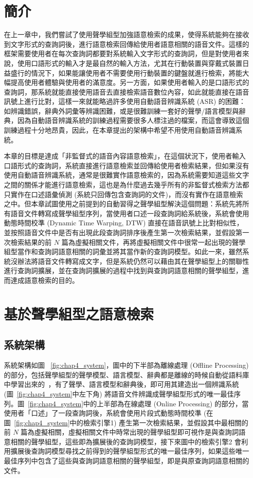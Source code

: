 \section{簡介}
在上一章中，我們嘗試了使用聲學組型加強語意檢索的成果，使得系統能夠在接收到文字形式的查詢詞後，進行語意檢索回傳給使用者語意相關的語音文件。這樣的框架需要使用者在每次查詢詞都要對系統輸入文字形式的查詢詞，但是對使用者來說，使用口語形式的輸入才是最自然的輸入方法，尤其在行動裝置與穿戴式裝置日益盛行的情況下，如果能讓使用者不需要使用行動裝置的鍵盤就進行檢索，將能大幅提高使用者體驗與使用者的滿意度。另一方面，如果使用者輸入的是口語形式的查詢詞，那系統就能直接使用語音去直接檢索語音數位內容，如此就能直接在語音訊號上進行比對，這樣一來就能略過許多使用自動語音辨識系統 (ASR) 的困難：如辨識錯誤，辭典外詞彙等辨識困難，或是很難訓練一套好的聲學/語言模型與辭典，因為自動語音辨識系統的訓練過程需要很多人標注過的檔案，而這會導致這個訓練過程十分地昂貴，因此，在本章提出的架構中希望不用使用自動語音辨識系統。

本章的目標是達成「非監督式的語音內容語意檢索」，在這個狀況下，使用者輸入口語形式的查詢詞，系統直接進行語意檢索並回傳給使用者檢索結果，但如果沒有使用自動語音辨識系統，通常是很難實作語意檢索的，因為系統需要知道這些文字之間的關係才能進行語意檢索，這也是為什麼過去幾乎所有的非監督式檢索方法都只實作在口述語彙偵測
(系統只回傳包含查詢詞的文件)，而沒有實作在語意檢索之中。但本章試圖使用之前提到的自動習得之聲學組型解決這個問題：系統先將所有語音文件轉寫成聲學組型序列，當使用者口述一段查詢詞給系統後，系統會使用動態時間校準 (Dynamic Time Warping, DTW) 直接在語音訊號上比對相似性，並按照語音文件中是否有出現此段查詢詞排序後產生第一次檢索結果，並假設第一次檢索結果的前 $N$
篇為虛擬相關文件，再將虛擬相關文件中很常一起出現的聲學組型當作和查詢詞語意相關的詞彙並將其當作新的查詢詞模型。如此一來，雖然系統沒辦法將語音文件轉寫成文字，但是系統仍然可以藉由其在聲學組型上的關聯性進行查詢詞擴展，並在查詢詞擴展的過程中找到與查詢詞語意相關的聲學組型，進而達成語意檢索的目的。

\section{基於聲學組型之語意檢索}
\subsection{系統架構}
系統架構如圖 ~\ref{fig:chap4_system}，圖中的下半部為離線處理 (Offline Processing) 的部分，包括聲學組型的聲學模型、語言模型、辭典都是離線的時候自動從語料庫中學習出來的~\cite{chung2013unsupervised}，有了聲學、語言模型和辭典後，即可用其建造出一個辨識系統 (圖~\ref{fig:chap4_system}中左下角) 將語音文件辨識成聲學組型形式的唯一最佳序列。圖~\ref{fig:chap4_system}中的上半部為在線處理 (Online Processing)
的部分，當使用者「口述」了一段查詢詞後，系統會使用片段式動態時間校準 (在圖~\ref{fig:chap4_system}中的檢索引擎1) 產生第一次檢索結果，並假設其中最相關的前 $N$ 篇為虛擬相關，虛擬相關文件中時常出現的聲學組型即可視作是與查詢詞語意相關的聲學組型，這些即為擴展後的查詢詞模型，接下來圖中的檢索引擎2 會利用擴展後查詢詞模型尋找之前得到的聲學組型形式的唯一最佳序列，如果這些唯一最佳序列中包含了這些與查詢詞語意相關的聲學組型，即是與原查詢詞語意相關的文件。

